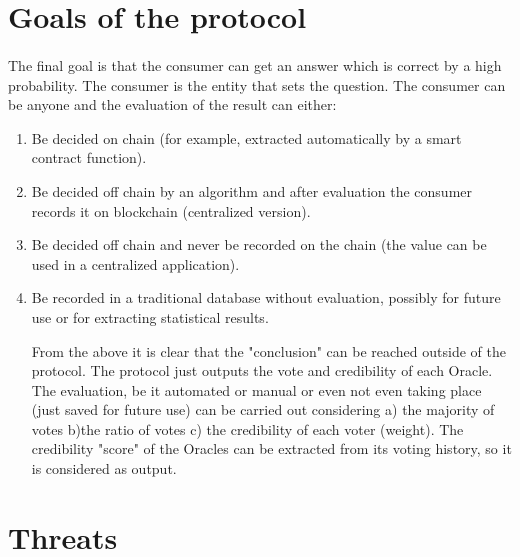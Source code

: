 \documentclass{article}
\begin{document}
\section{Goals of the protocol}
\paragraph{ }
The final goal is that the consumer can get an answer which is correct by a high probability. The consumer is the entity that sets the question. The consumer can be anyone and the evaluation of the result can either:
\begin{enumerate}
\item Be decided on chain (for example, extracted automatically by a smart contract function).
\item Be decided off chain by an algorithm and after evaluation the consumer records it on blockchain (centralized version).
\item Be decided off chain and never be recorded on the chain (the value can be used in a centralized application).
\item Be recorded in a traditional database without evaluation, possibly for future use or for extracting statistical results.

From the above it is clear that the "conclusion" can be reached outside of the protocol. The protocol just outputs the vote and credibility of each Oracle. The evaluation, be it automated or manual or even not even taking place (just saved for future use) can be carried out considering a) the majority of votes b)the ratio of votes c) the credibility of each voter (weight). The credibility "score" of the Oracles can be extracted from its voting history, so it is considered as output.
\end{enumerate}
 
 \section{Threats}
\end{document}
